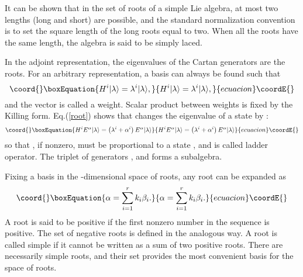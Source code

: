 \documentclass[a4paper,12pt]{report}
\begin{document}
It can be shown that in the set of roots of a simple Lie algebra, at most two lengths (long and short) are
possible, and the standard normalization convention is to set the square length of the long roots equal to two.
When all the roots have the same length, the algebra is said to be simply laced.

In the adjoint representation, the eigenvalues of the Cartan generators are the roots. For an arbitrary
representation, a basis \myHighlight{$\left\{|\lambda\rangle\right\}$}\coordHE{} can always be found such that
\begin{equation}\coord{}\boxEquation{
H^{i}|\lambda\rangle=\lambda^{i}|\lambda\rangle,
}{
H^{i}|\lambda\rangle=\lambda^{i}|\lambda\rangle,
}{ecuacion}\coordE{}\end{equation}
and the vector \coordHE{} is called a weight. Scalar product between
weights is fixed by the Killing form. Eq.(\ref{root}) shows that \coordHE{} changes the eigenvalue of a state
by \myHighlight{$\alpha$}\coordHE{}:
\begin{equation}\coord{}\boxEquation{
H^{i}E^{\alpha}|\lambda\rangle=\left(\lambda^{i}+\alpha^{i}\right)E^{\alpha}|\lambda\rangle
}{
H^{i}E^{\alpha}|\lambda\rangle=\left(\lambda^{i}+\alpha^{i}\right)E^{\alpha}|\lambda\rangle
}{ecuacion}\coordE{}\end{equation}
so that \coordHE{}, if nonzero, must be proportional to a state \myHighlight{$|\lambda+\alpha\rangle$}\coordHE{}, and
\coordHE{} is called ladder operator. The triplet of generators \coordHE{}, \coordHE{} and \coordHE{} forms a \coordHE{} subalgebra.

Fixing a basis \coordHE{} in the \coordHE{}-dimensional space of roots, any root can be
expanded as
\begin{equation}\coord{}\boxEquation{
\alpha=\sum_{i=1}^{r}k_{i}\beta_{i}.
}{
\alpha=\sum_{i=1}^{r}k_{i}\beta_{i}.
}{ecuacion}\coordE{}\end{equation}
A root \myHighlight{$\alpha$}\coordHE{} is said to be positive \myHighlight{$\left(\alpha\in\Delta_{+}\right)$}\coordHE{} if the first nonzero number in the
sequence \coordHE{} is positive. The set of negative roots \myHighlight{$\Delta_{-}$}\coordHE{} is defined in the
analogous way. A root \coordHE{} is called simple if it cannot be written as a sum of two positive roots. There
are necessarily \coordHE{} simple roots, and their set \coordHE{} provides the most
convenient basis for the space of roots.
\end{document}
